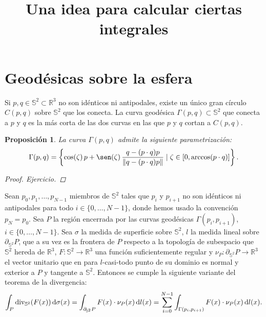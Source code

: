 \documentclass[reqno]{amsart}
\newcommand{\dd}[1][y]{\if#1y\,\fi{\mathrm d}} %
\newcommand{\norm}[2][y]{\if#1y\left\fi\lVert#2\if#1y\right\fi\rVert} %
\newtheorem{proposition}[thm]{Proposición}
\begin{document}
\title{Una idea para calcular ciertas integrales}
\maketitle

\section{Geodésicas sobre la esfera}

Si $p, q \in \mathbb{S}^2 \subset \mathbb{R}^3$ no son idénticos ni antipodales, existe un único gran círculo $C(p,q)$ sobre $\mathbb{S}^2$ que los conecta.
La curva geodésica $\Gamma(p,q) \subset \mathbb{S}^2$ que conecta a $p$ y $q$ es la más corta de las dos curvas en las que $p$ y $q$ cortan a $C(p,q)$.

\begin{proposition} La curva $\Gamma(p,q)$ admite la siguiente parametrización:
%
\begin{equation*}
\Gamma(p,q) = \left\{ \cos(\zeta) \, p + \sen(\zeta) \, \frac{q - (p\cdot q)p}{\norm{q - (p\cdot q)p}} \mid \zeta \in [0, \arccos(p\cdot q)] \right\}.
\end{equation*}
%
\begin{proof} Ejercicio.
\end{proof}
\end{proposition}

Sean $p_0, p_1, \dotsc, p_{N-1}$ miembros de $\mathbb{S}^2$ tales que $p_i$ y $p_{i+1}$ no son idénticos ni antipodales para todo $i \in \{0, \dotsc, N-1\}$, donde hemos usado la convención $p_N = p_0$.
Sea $P$ la región encerrada por las curvas geodésicas $\Gamma(p_i, p_{i+1})$, $i \in \{0, \dotsc, N-1\}$.
Sea $\sigma$ la medida de superficie sobre $\mathbb{S}^2$, $l$ la medida lineal sobre $\partial_{\mathbb{S}^2} P$, que a su vez es la frontera de $P$ respecto a la topología de subespacio que $\mathbb{S}^2$ hereda de $\mathbb{R}^3$, $F \colon \mathbb{S}^2 \to \mathbb{R}^3$ una función suficientemente regular y $\nu_P \colon \partial_{\mathbb{S}^2} P \to \mathbb{R}^3$ el vector unitario que en para $l$-casi-todo punto de su dominio es normal y exterior a $P$ y tangente a $\mathbb{S}^2$.
Entonces se cumple la siguiente variante del teorema de la divergencia:
%
\begin{equation*}
\int_P \operatorname{div}_{\mathbb{S}^2}(F(x)) \dd\sigma(x)
= \int_{\partial_{\mathbb{S}^2} P} F(x) \cdot \nu_P(x) \dd l(x)
= \sum_{i=0}^{N-1} \int_{\Gamma(p_i,p_{i+1})} F(x) \cdot \nu_P(x) \dd l(x).
\end{equation*}
\end{document}
